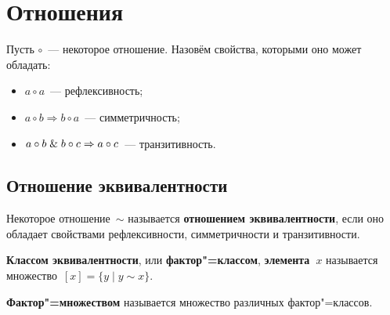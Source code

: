 \section{Отношения}
 Пусть $\circ$~--- некоторое отношение.
Назовём свойства, которыми оно может обладать:
\begin{itemize}
	\item $a \circ a$~--- рефлексивность;
	\item $a \circ b \Rightarrow b \circ a$~--- симметричность;
	\item $a \circ b \mathrel{\&} b \circ c \Rightarrow a \circ c$~--- транзитивность.
\end{itemize}

\subsection{Отношение эквивалентности}
 Некоторое отношение~$\sim$ называется \textbf{отношением эквивалентности}, если оно обладает свойствами рефлексивности, симметричности и транзитивности.

  \textbf{Классом эквивалентности}, или \textbf{фактор"=классом}, \textbf{элемента~$x$} называется множество~$[x] = \{ y \mid y \sim x \}$.

 \textbf{Фактор"=множеством} называется множество различных фактор"=классов.
